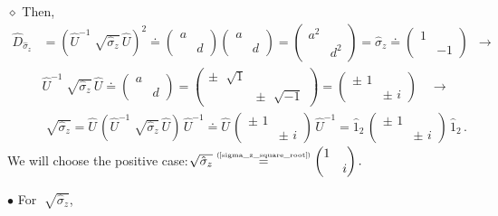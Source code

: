 \documentclass[11pt]{article}
\numberwithin{equation}{section} %
\numberwithin{figure}{section} %
\newcommand\numeq[1] %
  {\stackrel{\scriptscriptstyle(\mkern-1.5mu#1\mkern-1.5mu)}{=}}
\begin{document}
\begin{appendices}
$\diamond$ Then, 
\begin{equation} \label{sigma_z_square_root}
\begin{split}
\hat{D}_{\hat{\sigma}_z} 
&	= (\hat{U}^{-1}\sqrt[]{\hat{\sigma}_z}\,\hat{U})^2 \doteq \begin{pmatrix}a&\\&d\end{pmatrix} \begin{pmatrix}a&\\&d\end{pmatrix} = \begin{pmatrix}a^2&\\&d^2\end{pmatrix} = \hat{\sigma}_z \doteq \begin{pmatrix}1&\\&-1\end{pmatrix} \,\,\, \rightarrow \\
&	\hat{U}^{-1}\sqrt[]{\hat{\sigma}_z}\,\hat{U} \doteq \begin{pmatrix}a&\\&d\end{pmatrix} = \begin{pmatrix}\pm\,\,\sqrt[]{1}&\\&\pm\,\,\sqrt[]{-1}\end{pmatrix} = \begin{pmatrix}\pm\,\,1&\\&\pm\,\,i\end{pmatrix}\,\,\,\,\,\,\rightarrow \\
&	\sqrt[]{\hat{\sigma}_z} = \hat{U}\,(\hat{U}^{-1}\sqrt[]{\hat{\sigma}_z}\,\hat{U})\,\hat{U}^{-1} \doteq \hat{U}\, \begin{pmatrix}\pm\,\,1&\\&\pm\,\,i\end{pmatrix} \,\hat{U}^{-1} = \hat{1}_2\, \begin{pmatrix}\pm\,\,1&\\&\pm\,\,i\end{pmatrix} \,\hat{1}_2\,\textrm{.}
\end{split}
\end{equation}
We will choose the positive case: $\sqrt[]{\hat{\sigma}_z} \numeq{\textrm{\ref{sigma_z_square_root}}} \begin{pmatrix} 1&\\&i\end{pmatrix}\textrm{.}$

\noindent $\bullet$ For $\sqrt[]{\hat{\sigma}_z}$, 


\end{appendices}
\end{document}
